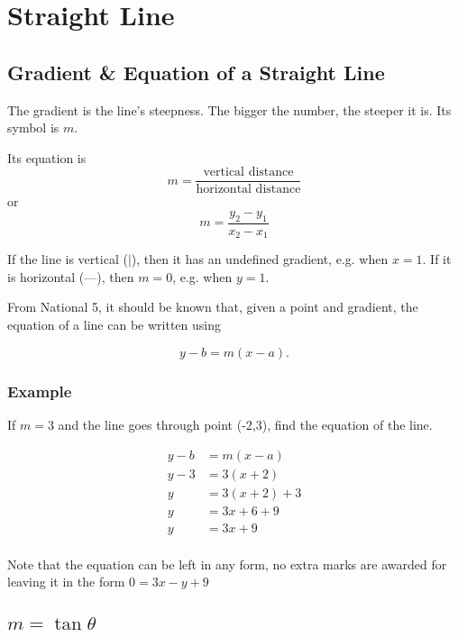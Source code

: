 \chapter{Straight Line}


\section{Gradient \& Equation of a Straight Line}
The gradient is the line's steepness. The bigger the number, the steeper it is. Its symbol is $m$.

Its equation is
\begin{equation*}
m = \frac{\text{vertical distance}}{\text{horizontal distance}}
\end{equation*}
or
\begin{equation}
m = \frac{y_2-y_1}{x_2-x_1}
\end{equation}

If the line is vertical ($\vert$), then it has an undefined gradient, e.g. when $x=1$. If it is horizontal (—), then $m=0$, e.g. when $y=1$.

From National 5, it should be known that, given a point and gradient, the equation of a line can be written using

\begin{equation}
y-b=m(x-a).
\end{equation}

\subsection{Example}
If $m=3$ and the line goes through point (-2,3), find the equation of the line.

\begin{align*}
y-b&=m(x-a)\\
y-3&=3(x+2)\\
y&=3(x+2)+3\\
y&=3x+6+9\\
y&=3x+9\\
\end{align*}

Note that the equation can be left in any form, no extra marks are awarded for leaving it in the form $0 = 3x - y + 9$


\section{$m=\tan\theta$}


